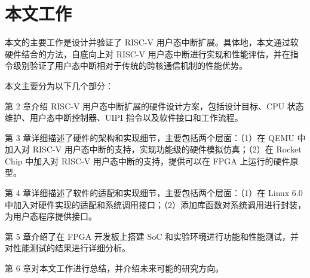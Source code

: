 \section{本文工作}

本文的主要工作是设计并验证了 RISC-V 用户态中断扩展。具体地，本文通过软硬件结合的方法，自底向上对 RISC-V 用户态中断进行实现和性能评估，并在指令级别验证了用户态中断相对于传统的跨核通信机制的性能优势。

本文主要分为以下几个部分：

第 2 章介绍 RISC-V 用户态中断扩展的硬件设计方案，包括设计目标、CPU 状态维护、用户态中断控制器、UIPI 指令以及软件接口和工作流程。

第 3 章详细描述了硬件的架构和实现细节，主要包括两个层面：（1）在 QEMU 中加入对 RISC-V 用户态中断的支持，实现功能级的硬件模拟仿真；（2）在 Rocket Chip 中加入对 RISC-V 用户态中断的支持，提供可以在 FPGA 上运行的硬件原型。

第 4 章详细描述了软件的适配和实现细节，主要包括两个层面：（1）在 Linux 6.0 中加入对硬件实现的适配和系统调用接口；（2）添加库函数对系统调用进行封装，为用户态程序提供接口。

第 5 章介绍了在 FPGA 开发板上搭建 SoC 和实验环境进行功能和性能测试，并对性能测试的结果进行详细分析。

第 6 章对本文工作进行总结，并介绍未来可能的研究方向。